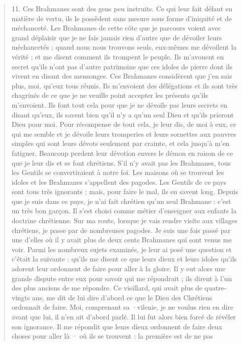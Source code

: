 \begin{quote}
11. Ces Brahmanes sont des gens peu instruits. Ce qui leur fait
défaut en matière de vertu, ils le possèdent sans mesure sous forme
d'iniquité et de méchanceté. Les Brahmanes de cette côte que je
parcours voient avec grand déplaisir que je ne fais jamais rien
d'autre que de dévoiler leurs méchancetés ; quand nous nous trouvons
seuls, eux-mêmes me dévoilent la vérité ; et me disent comment
ils trompent le peuple. Ils m'avouent en secret qu'ils n'ont
pas d'autre patrimoine que ces idoles de pierre dont ils vivent en
disant des mensonges.
Ces Brahmanes considèrent que j'en sais plus, moi, qu'eux tous
réunis. Ils m'envoient des délégations et ils sont très chagrinés de
ce que je ne veuille point accepter les présents qu'ils m'envoient.
Ils font tout cela pour que je ne dévoile pas leurs secrets en disant
qu'eux, ils savent bien qu'il n'y a qu'un seul Dieu et qu'ils prieront
Dieu pour moi. Pour récompense de tout cela, je leur dis, de
moi à eux, ce qui me semble et je dévoile leurs tromperies et leurs
sornettes aux pauvres simples qui sont leurs dévots seulement par
crainte, et cela jusqu'à m'en fatiguer. Beaucoup perdent leur dévotion
envers le démon en raison de ce que je leur dis et se font chrétiens.
S'il n'y avait pas les Brahmanes, tous les Gentils se convertiraient
à notre foi. Les maisons où se trouvent les idoles et les
Brahmanes s'appellent des pagodes.
Les Gentils de ce pays sont tous très ignorants ; mais, pour faire
le mal, ils en savent long. Depuis que je suis dans ce pays, je n'ai
fait chrétien qu'un seul Brahmane : c'est un très bon garçon. Il
s'est choisi comme métier d'enseigner aux enfants la doctrine
chrétienne.
Sur ma route, lorsque je vais rendre visite aux villages chrétiens,
je passe par de nombreuses pagodes. Je suis une fois passé par une
d'elles où il y avait plus de deux cents Brahmanes qui sont venus
me voir. Parmi les nombreux sujets examinés, je leur ai posé une
question et c'était la suivante : qu'ils me disent ce que leurs dieux
et leurs idoles qu'ils adorent leur ordonnent de faire pour aller à
la gloire. Il y eut alors une grande dispute entre eux pour savoir
qui me répondrait ; ils dirent à l'un des plus anciens de me répondre.
  Ce vieillard, qui avait plus de quatre-vingts ans, me dit de lui
dire d'abord ce que le Dieu des Chrétiens ordonnait de faire. Moi,
comprenant sa ·vilenie, je ne voulus rien en dire avant que lui, il
n'en ait d'abord parlé. Il lui fut alors bien forcé de révéler son
ignorance. Il me répondit que leurs dieux ordonnent de faire deux
choses pour aller là · où ils se trouvent : la première est de ne pas

\end{quote}
